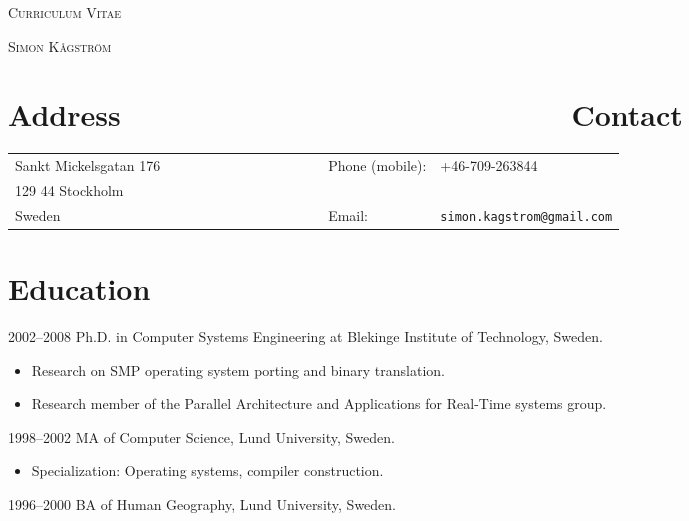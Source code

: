 \documentclass[a4paper]{article}
\begin{document}
\pagestyle{empty}

\begin{center}
\huge{\textsc{Curriculum Vitae}}
\vspace{0.3cm}

\Large{\textsc{Simon Kågström}}
\end{center}
\vspace{0.5cm}

\section{Address~~~~~~~~~~~~~~~~~~~~~~~~~~~~Contact}
\begin{table}[h]
\begin{tabular}{@{}lll@{}}
  Sankt Mickelsgatan 176~~~~~~~~~~~~~~~~~~~~~~&  Phone (mobile):& +46-709-263844 \\
  129 44 Stockholm & \\
  Sweden & Email: & \texttt{simon.kagstrom@gmail.com} \\
\end{tabular}
\end{table}


\section{Education}

\begin{CV}
\item[2002--2008] Ph.D. in Computer Systems Engineering at Blekinge Institute of Technology,
  Sweden.

  \begin{itemize}
  \item Research on SMP operating system porting and binary translation.
  \item Research member of the Parallel Architecture and Applications for
    Real-Time systems group.
  \end{itemize}

\item[1998--2002] MA of Computer Science, Lund University, Sweden.
  \begin{itemize}
  \item Specialization: Operating systems, compiler construction.
  \end{itemize}

\item[1996--2000] BA of Human Geography, Lund University, Sweden.

\end{CV}
\end{document}
